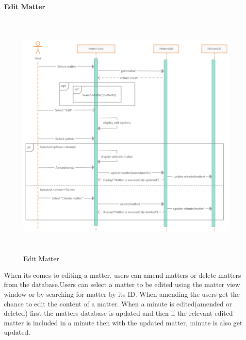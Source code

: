 \documentclass[a4paper,beamer]{article}
\begin{document}
		\textbf{Edit Matter}\newline
		\begin{figure}[h!]
			\begin{center}
			\includegraphics[width=6in,height=5in]{img/seq-edit-matter}
			\end{center}
			\caption{Edit Matter}
			\label{fig:edit-matter}
		\end{figure}
		        
		When its comes to editing a matter, users can amend matters or delete matters from the database.Users can select a matter to be edited using the matter view window or by searching for matter by its ID.\newline
		When amending the users get the chance to edit the content of a matter.
		When a minute is edited(amended or deleted) first the matters database is updated and then if the relevant edited matter is included in a minute then with the updated matter, minute is also get updated.\newline
		\newpage
		
\end{document}
